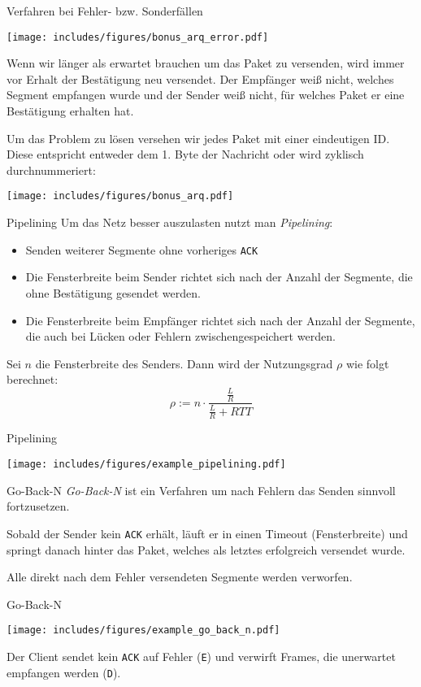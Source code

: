\begin{bonus}{Verfahren bei Fehler- bzw. Sonderfällen}
    \begin{center}
        \texttt{[image: includes/figures/bonus\_arq\_error.pdf]}
    \end{center}

    Wenn wir länger als erwartet brauchen um das Paket zu versenden, wird immer vor Erhalt der Bestätigung neu versendet.
    Der Empfänger weiß nicht, welches Segment empfangen wurde und der Sender weiß nicht, für welches Paket er eine Bestätigung erhalten hat.

    Um das Problem zu lösen versehen wir jedes Paket mit einer eindeutigen ID.
    Diese entspricht entweder dem 1. Byte der Nachricht oder wird zyklisch durchnummeriert:

    \begin{center}
        \texttt{[image: includes/figures/bonus\_arq.pdf]}
    \end{center}
\end{bonus}

\begin{defi}{Pipelining}
    Um das Netz besser auszulasten nutzt man \emph{Pipelining}:
    \begin{itemize}
        \item Senden weiterer Segmente ohne vorheriges \texttt{ACK}
        \item Die Fensterbreite beim Sender richtet sich nach der Anzahl der Segmente, die ohne Bestätigung gesendet werden.
        \item Die Fensterbreite beim Empfänger richtet sich nach der Anzahl der Segmente, die auch bei Lücken oder Fehlern zwischengespeichert werden.
    \end{itemize}

    Sei $n$ die Fensterbreite des Senders.
    Dann wird der Nutzungsgrad $\rho$ wie folgt berechnet:
    \[
        \rho := n \cdot \frac{\frac{L}{R}}{\frac{L}{R} + RTT}
    \]
\end{defi}

\begin{example}{Pipelining}
    \begin{center}
        \texttt{[image: includes/figures/example\_pipelining.pdf]}
    \end{center}
\end{example}

\begin{defi}{Go-Back-N}
    \emph{Go-Back-N} ist ein Verfahren um nach Fehlern das Senden sinnvoll fortzusetzen.

    Sobald der Sender kein \texttt{ACK} erhält, läuft er in einen Timeout (Fensterbreite) und springt danach hinter das Paket, welches als letztes erfolgreich versendet wurde.

    Alle direkt nach dem Fehler versendeten Segmente werden verworfen.
\end{defi}

\begin{example}{Go-Back-N}
    \begin{center}
        \texttt{[image: includes/figures/example\_go\_back\_n.pdf]}
    \end{center}

    Der Client sendet kein \texttt{ACK} auf Fehler (\texttt{E}) und verwirft Frames, die unerwartet empfangen werden (\texttt{D}).
\end{example}